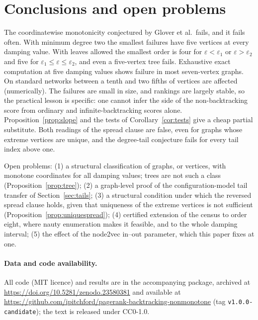 \documentclass[11pt,a4paper]{article}
\theoremstyle{definition}\newtheorem{conjecture}{Conjecture}
\theoremstyle{remark}\newtheorem{remark}[theorem]{Remark}
\newcommand{\eps}{\varepsilon}
\begin{document}
\section{Conclusions and open problems}\label{sec:conclusion}
The coordinatewise monotonicity conjectured by Glover et al.\ fails, and it fails often. With minimum degree two the smallest failures have five vertices at every damping value. With leaves allowed the smallest order is four for $\eps<\eps_1$ or $\eps>\eps_2$ and five for $\eps_1\leq\eps\leq\eps_2$, and even a five-vertex tree fails. Exhaustive exact computation at five damping values shows failure in most seven-vertex graphs. On standard networks between a tenth and two fifths of vertices are affected (numerically). The failures are small in size, and rankings are largely stable, so the practical lesson is specific: one cannot infer the side of the non-backtracking score from ordinary and infinite-backtracking scores alone. Proposition~\ref{prop:slope} and the tests of Corollary~\ref{cor:tests} give a cheap partial substitute. Both readings of the spread clause are false, even for graphs whose extreme vertices are unique, and the degree-tail conjecture fails for every tail index above one.

Open problems: (1) a structural classification of graphs, or vertices, with monotone coordinates for all damping values; trees are not such a class (Proposition~\ref{prop:tree}); (2) a graph-level proof of the configuration-model tail transfer of Section~\ref{sec:tails}; (3) a structural condition under which the reversed spread clause holds, given that uniqueness of the extreme vertices is not sufficient (Proposition~\ref{prop:uniquespread}); (4) certified extension of the census to order eight, where nauty enumeration makes it feasible, and to the whole damping interval; (5) the effect of the node2vec in--out parameter, which this paper fixes at one.

\paragraph{Data and code availability.} All code (MIT licence) and results are in the accompanying package, archived at \url{https://doi.org/10.5281/zenodo.23580381} and available at \url{https://github.com/ipitchford/pagerank-backtracking-nonmonotone} (tag \texttt{v1.0.0-candidate}); the text is released under CC0-1.0.
\end{document}
